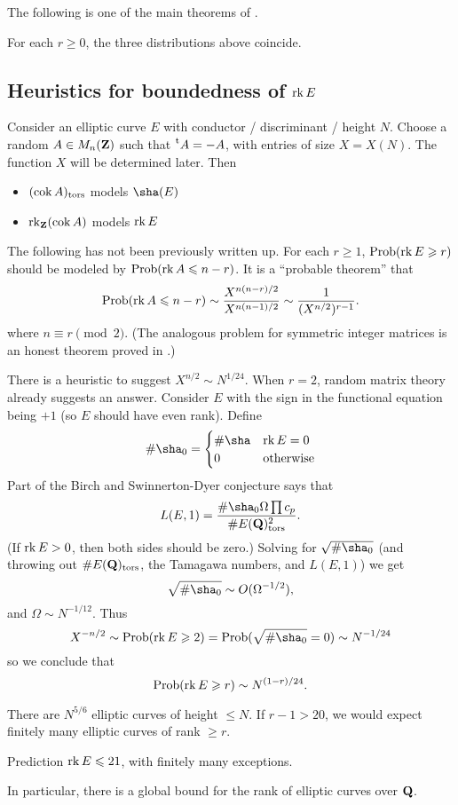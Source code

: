 The following is one of the main theorems of \cite{bklpr13}. 

\begin{theo}
For each $r\geqslant 0$, the three distributions above coincide. 
\end{theo}





\subsection{Heuristics for boundedness of \texorpdfstring{$\operatorname{rk} E$}{rk E}}

Consider an elliptic curve $E$ with conductor / discriminant / height $N$. 
Choose a random $A\in M_n(\mathbf{Z})$ such that $\prescript{\mathrm{t}}{}{A}=-A$, with entries 
of size $X=X(N)$. The function $X$ will be determined later. Then 
\begin{itemize}
  \item $(\operatorname{cok} A)_\mathrm{tors}$ models $\sha(E)$ 
  \item $\operatorname{rk}_{\mathbf{Z}}(\operatorname{cok} A)$ models $\operatorname{rk} E$
\end{itemize}

The following has not been previously written up. For each $r\geqslant 1$, 
$\operatorname{Prob}(\operatorname{rk} E\geqslant r)$ should be modeled by 
$\operatorname{Prob}(\operatorname{rk} A\leqslant n-r)$. It is a ``probable theorem'' that 
\[
  \operatorname{Prob}(\operatorname{rk} A\leqslant n-r) \sim \frac{X^{n(n-r)/2}}{X^{n(n-1)/2}} \sim \frac{1}{(X^{n/2})^{r-1}} .
\]
where $n\equiv r\pmod 2$. (The analogous problem for symmetric integer matrices 
is an honest theorem proved in \cite{ek95}.) 

There is a heuristic to suggest $X^{n/2}\sim N^{1/24}$. When $r=2$, random 
matrix theory already suggests an answer. Consider $E$ with the sign in the 
functional equation being $+1$ (so $E$ should have even rank). Define 
\[
  \# \sha_0 = \begin{cases} \# \sha & \rank E=0 \\ 0 & \text{otherwise} \end{cases}
\]
Part of the Birch and Swinnerton-Dyer conjecture says that 
\[
  L(E,1) = \frac{\# \sha_0 \Omega \prod c_p}{\# E(\dQ)_\mathrm{tors}^2} .
\]
(If $\operatorname{rk} E>0$, then both sides should be zero.) Solving for 
$\sqrt{\#\sha_0}$ (and throwing out $\#E(\mathbf{Q})_\mathrm{tors}$, the Tamagawa 
numbers, and $L(E,1)$) we get 
\[
  \sqrt{\#\sha_0} \sim O(\Omega^{-1/2}) ,
\]
and $\Omega\sim N^{-1/12}$. Thus 
\[
  X^{-n/2} \sim \probability(\rank E\geqslant 2) = \probability(\sqrt{\#\sha_0} = 0) \sim N^{-1/24}
\]
so we conclude that 
\[
  \operatorname{Prob}(\operatorname{rk} E\geqslant r) \sim N^{(1-r)/24} .
\]

There are $N^{5/6}$ elliptic curves of height $\leqslant N$. If $r-1>20$, we 
would expect finitely many elliptic curves of rank $\geqslant r$. 

\begin{enonce}{Prediction}
$\operatorname{rk} E\leqslant 21$, with finitely many exceptions. 
\end{enonce}

In particular, there is a global bound for the rank of elliptic curves over 
$\mathbf{Q}$. 




